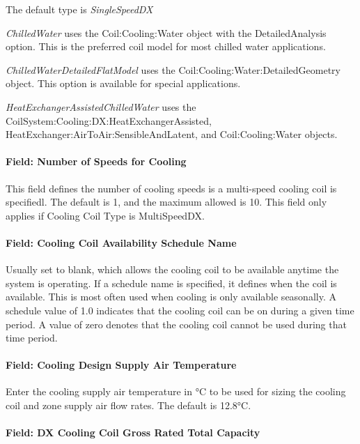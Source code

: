 The default type is \emph{SingleSpeedDX}

\emph{ChilledWater} uses the Coil:Cooling:Water object with the DetailedAnalysis option. This is the preferred coil model for most chilled water applications.

\emph{ChilledWaterDetailedFlatModel} uses the Coil:Cooling:Water:DetailedGeometry object. This option is available for special applications.

\emph{HeatExchangerAssistedChilledWater} uses the CoilSystem:Cooling:DX:HeatExchangerAssisted, HeatExchanger:AirToAir:SensibleAndLatent, and Coil:Cooling:Water objects.

\paragraph{Field: Number of Speeds for Cooling}\label{field-number-of-speeds-for-cooling}

This field defines the number of cooling speeds is a multi-speed cooling coil is specifiedl. The default is 1, and the maximum allowed is 10. This field only applies if Cooling Coil Type is MultiSpeedDX.

\paragraph{Field: Cooling Coil Availability Schedule Name}\label{field-cooling-coil-availability-schedule-name-6}

Usually set to blank, which allows the cooling coil to be available anytime the system is operating. If a schedule name is specified, it defines when the coil is available. This is most often used when cooling is only available seasonally. A schedule value of 1.0 indicates that the cooling coil can be on during a given time period. A value of zero denotes that the cooling coil cannot be used during that time period.

\paragraph{Field: Cooling Design Supply Air Temperature}\label{field-cooling-design-supply-air-temperature-2}

Enter the cooling supply air temperature in °C to be used for sizing the cooling coil and zone supply air flow rates. The default is 12.8°C.

\paragraph{Field: DX Cooling Coil Gross Rated Total Capacity}\label{field-dx-cooling-coil-gross-rated-total-capacity}

